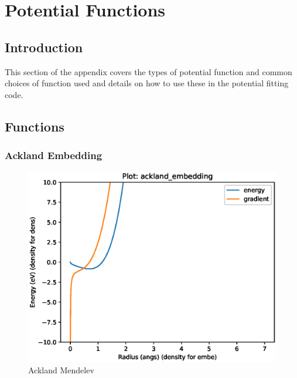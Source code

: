 \chapter{Potential Functions}
\label{chapter:potentialfunctions}

\FloatBarrier
\section{Introduction}

This section of the appendix covers the types of potential function and common choices of function used and details on how to use these in the potential fitting code.



\section{Functions}



\FloatBarrier
\subsection{Ackland Embedding}





\FloatBarrier
\begin{figure}[h]
  \begin{center}
    \includegraphics[width=0.7\linewidth]{appendix/functions/pots_plots/ackland_embedding.eps}
    \caption{Ackland Mendelev}
    \label{figure:functionsacklandmendelev}
  \end{center}
\end{figure}




